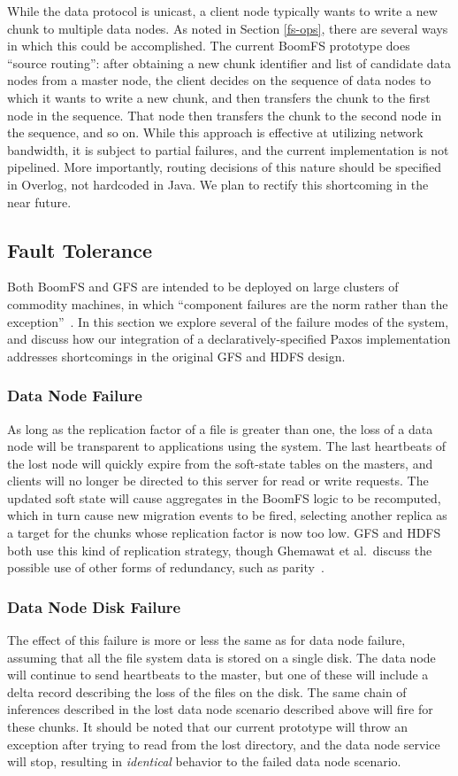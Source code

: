 \documentclass[twocolumn]{article}
\begin{document}
While the data protocol is unicast, a client node typically wants to
write a new chunk to multiple data nodes. As noted in Section
\ref{fs-ops}, there are several ways in which this could be
accomplished. The current BoomFS prototype does ``source routing'':
after obtaining a new chunk identifier and list of candidate data
nodes from a master node, the client decides on the sequence of data
nodes to which it wants to write a new chunk, and then transfers the
chunk to the first node in the sequence. That node then transfers the
chunk to the second node in the sequence, and so on. While this
approach is effective at utilizing network bandwidth, it is subject to
partial failures, and the current implementation is not
pipelined. More importantly, routing decisions of this nature should
be specified in Overlog, not hardcoded in Java. We plan to rectify
this shortcoming in the near future.

\subsection{Fault Tolerance}
Both BoomFS and GFS are intended to be deployed on large clusters of
commodity machines, in which ``component failures are the norm rather
than the exception''~\cite{gfs}.  In this section we explore several
of the failure modes of the system, and discuss how our integration of
a declaratively-specified Paxos implementation addresses shortcomings
in the original GFS and HDFS design.

\subsubsection{Data Node Failure}
As long as the replication factor of a file is greater than one, the
loss of a data node will be transparent to applications using the
system.  The last heartbeats of the lost node will quickly expire from
the soft-state tables on the masters, and clients will no longer be
directed to this server for read or write requests.  The updated soft
state will cause aggregates in the BoomFS logic to be recomputed, which
in turn cause new migration events to be fired, selecting another
replica as a target for the chunks whose replication factor is now too
low.  GFS and HDFS both use this kind of replication strategy, though
Ghemawat et al.\ discuss the possible use of other forms of redundancy,
such as parity~\cite{gfs}.

\subsubsection{Data Node Disk Failure}
The effect of this failure is more or less the same as for data node
failure, assuming that all the file system data is stored on a single
disk.  The data node will continue to send heartbeats to the master,
but one of these will include a delta record describing the loss of
the files on the disk.  The same chain of inferences described in the
lost data node scenario described above will fire for these chunks.
It should be noted that our current prototype will throw an exception
after trying to read from the lost directory, and the data node
service will stop, resulting in \emph{identical} behavior to the
failed data node scenario.
\end{document}
